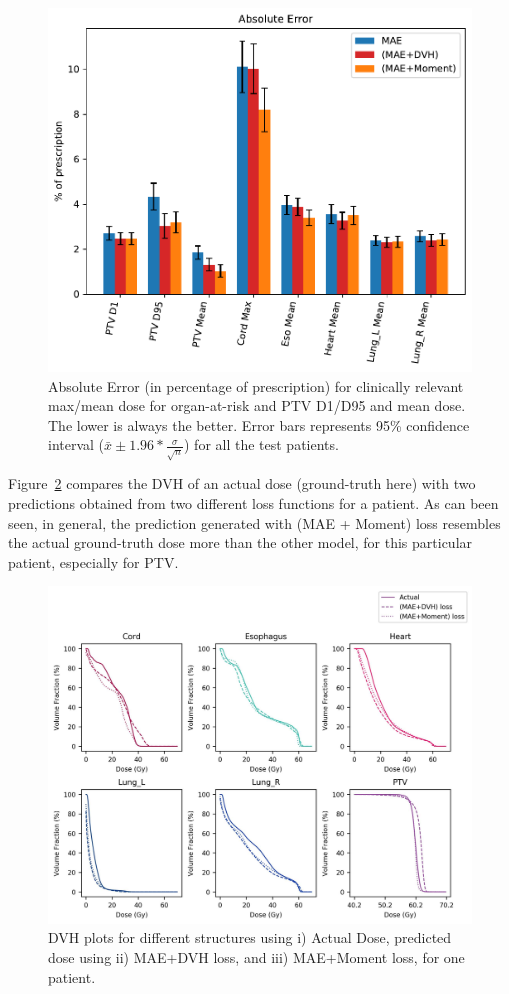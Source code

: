 \documentclass[10pt]{article}
\begin{document}
\begin{figure}[htb!]
    \centering
    \includegraphics[width=0.95\linewidth]{AbsoluteErrorDev.pdf}%
    \caption{Absolute Error (in percentage of prescription) for clinically relevant max/mean dose for organ-at-risk and PTV D1/D95 and mean dose. The lower is always the better. Error bars represents 95\% confidence interval ($\bar{x} \pm 1.96*\frac{\sigma}{\sqrt{n}}$) for all the test patients.}
    \label{fig:AbsoluteError}
\end{figure}

Figure~\ref{fig:DVHPlots} compares the DVH of an actual dose (ground-truth here) with {two} predictions obtained from two different loss functions for a patient. As can been seen, in general, the prediction generated with (MAE + Moment) loss resembles the actual ground-truth dose more than the other model, for this particular patient, especially for PTV.

\begin{figure}[htb!]
    \centering
    \includegraphics[width=0.95\linewidth]{DVHPlotsNoMAE.pdf}%
    \caption{DVH plots for different structures using i) Actual Dose, predicted dose using ii) MAE+DVH loss, and iii) MAE+Moment loss, for one patient.}
    \label{fig:DVHPlots}
\end{figure}
\end{document}
